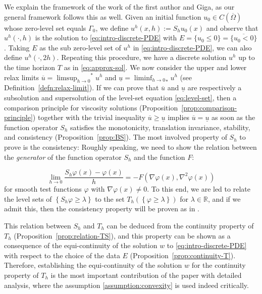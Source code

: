 \documentclass[11pt]{article}
\numberwithin{equation}{section}
\newcommand{\R}{\mathbb{R}}
\newcommand{\closure}[1]{\overline{#1}}
\def\leq{\leqslant}
\def\geq{\geqslant}
\begin{document}
We explain the framework of the work \cite{EG25} of the first author and Giga, as our general framework follows this as well.
Given an initial function $u_0 \in C(\closure{\Omega})$ whose zero-level set equals $\Gamma_0$,
we define $u^h(x,h) := S_hu_0(x)$ and observe that $u^h(\cdot,h)$ is the solution to \eqref{eq:intro-discrete-PDE} with $E = \{u_0 \leq 0\} = \closure{\{u_0 < 0\}}$.
Taking $E$ as the sub zero-level set of $u^h$ in \eqref{eq:intro-discrete-PDE}, we can also define $u^h(\cdot,2h)$.
Repeating this procedure, we have a discrete solution $u^h$ up to the time horizon $T$ as in \eqref{eq:approx-sol}.
We now consider the upper and lower relax limits $\overline{u} = {\limsup_{h\to 0}}^* u^h$ and $\underline{u} = {\liminf_{h\to 0}}_* u^h$ (see Definition~\ref{defn:relax-limit}).
If we can prove that $\overline{u}$ and $\underline{u}$ are respectively a subsolution and supersolution of the level-set equation \eqref{eq:level-set},
then a comparison principle for viscosity solutions (Proposition~\ref{prop:comparison-principle}) together with the trivial inequality $\overline{u}\geq \underline{u}$
implies $\overline{u} = \underline{u}$ as soon as the function operator $S_h$ satisfies the monotonicity, translation invariance, stability, and consistency (Proposition~\ref{prop:BS}).
The most involved property of $S_h$ to prove is the consistency: Roughly speaking, we need to show the relation between the \textit{generator} of the function operator $S_h$ and the function $F$:

\begin{equation}
    \label{eq:intro-consistency}
    \lim_{h\to 0}\frac{S_h\varphi(x) - \varphi(x)}{h} = -F(\nabla\varphi(x), \nabla^2\varphi(x))
\end{equation}
for smooth test functions $\varphi$ with $\nabla\varphi(x)\neq 0$.
To this end, we are led to relate the level sets of $\left\{S_h\varphi\geq \lambda\right\}$ to the set $T_h(\left\{\varphi\geq \lambda\right\})$ for $\lambda\in\R$,
and if we admit this, then the consistency property will be proven as in \cite{EG25}.

This relation between $S_h$ and $T_h$ can be deduced from the continuity property of $T_h$ (Proposition~\ref{prop:relation-TS}),
and this property can be shown as a consequence of the equi-continuity of the solution $w$ to \eqref{eq:intro-discrete-PDE} with respect to the choice of the data $E$ (Proposition~\ref{prop:continuity-T}). Therefore, establishing the equi-continuity of the solution $w$ for the continuity property of $T_h$ is the most important contribution of the paper with detailed analysis, where the assumption \eqref{assumption:convexity} is used indeed critically.
\end{document}
